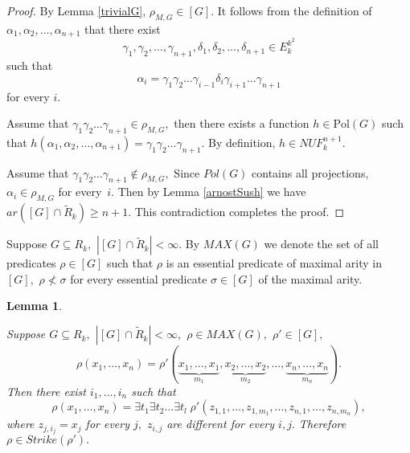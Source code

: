\documentclass{au}
\theoremstyle{plain}
\newtheorem{lemma}{Lemma}
\theoremstyle{definition}
\theoremstyle{remark}
\numberwithin{equation}{section}
\begin{document}
\begin{proof}
By Lemma \ref{trivialG}, $\rho_{M,G}\in [G].$
It follows from the definition of $\alpha_{1},\alpha_{2},\ldots,\alpha_{n+1}$ that
there exist
$$\gamma_{1},\gamma_{2},\ldots,\gamma_{n+1},
\delta_{1},\delta_{2},\ldots,\delta_{n+1}\in E_{k}^{k^{2}}$$
such that
$$\alpha_{i} =
\gamma_{1}\gamma_{2}\ldots \gamma_{i-1} \delta_{i} \gamma_{i+1}\ldots \gamma_{n+1}$$
for every $i.$

Assume that $\gamma_{1}\gamma_{2}\ldots\gamma_{n+1} \in \rho_{M,G},$
then there exists a function $h\in {
\mathrm{Pol}
}(G)$
such that $h(\alpha_{1},\alpha_{2},\ldots,\alpha_{n+1})=\gamma_{1}\gamma_{2}\ldots\gamma_{n+1}.$
By definition, $h\in NUF_{k}^{n+1}.$

Assume that $\gamma_{1}\gamma_{2}\ldots\gamma_{n+1} \notin \rho_{M,G},$
Since $Pol(G)$ contains all projections,
$\alpha_{i}\in \rho_{M,G}$ for every~$i.$
Then by Lemma \ref{arnostSush}
we have $ar([G] \cap \widetilde R_{k}) \ge n+1.$
This contradiction completes the proof.

\end{proof}

Suppose $G\subseteq R_{k},$ $|[G]\cap \widetilde R_{k}|<\infty.$
By $MAX(G)$ we denote the set of all predicates $\rho \in [G]$
such that
$\rho$ is an essential predicate of maximal arity in $[G],$
$\rho \not < \sigma$
for every essential predicate $\sigma \in[G]$ of the maximal arity.

\begin{lemma}\label{VycherkivanieSvobodnih}

Suppose $G\subseteq R_{k},$ $|[G]\cap \widetilde R_{k}|<\infty,$
$\rho\in MAX(G),$
$\rho' \in [G],$
$$\rho(x_{1},\ldots,x_{n}) =
\rho'(\underbrace{x_{1},\ldots,x_{1}}_{m_{1}},
\underbrace{x_{2},\ldots,x_{2}}_{m_{2}},
\ldots,
\underbrace{x_{n},\ldots,x_{n}}_{m_{n}}).$$
Then
there exist $i_{1},\ldots,i_{n}$ such that
$$\rho(x_{1},\ldots,x_{n}) =
\exists t_{1} \exists t_{2}\ldots \exists  t_{l} \;  \rho'(z_{1,1},\ldots,z_{1,m_{1}}, 
\ldots,z_{n,1},\ldots,z_{n,m_{n}}),
$$
where $z_{j,i_{j}} = x_{j}$ for every $j,$
$z_{i,j}$ are different for every $i,j.$
Therefore $\rho \in Strike(\rho').$

\end{lemma}
\end{document}
